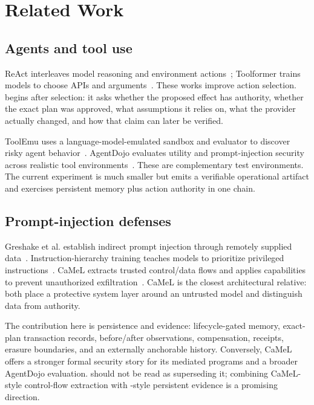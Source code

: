 \section{Related Work}

\subsection{Agents and tool use}

ReAct interleaves model reasoning and environment actions~\cite{yao2023react}; Toolformer trains models to choose APIs and arguments~\cite{schick2023toolformer}. These works improve action selection. \system{} begins after selection: it asks whether the proposed effect has authority, whether the exact plan was approved, what assumptions it relies on, what the provider actually changed, and how that claim can later be verified.

ToolEmu uses a language-model-emulated sandbox and evaluator to discover risky agent behavior~\cite{ruan2023toolemu}. AgentDojo evaluates utility and prompt-injection security across realistic tool environments~\cite{debenedetti2024agentdojo}. These are complementary test environments. The current \system{} experiment is much smaller but emits a verifiable operational artifact and exercises persistent memory plus action authority in one chain.

\subsection{Prompt-injection defenses}

Greshake et al. establish indirect prompt injection through remotely supplied data~\cite{greshake2023indirect}. Instruction-hierarchy training teaches models to prioritize privileged instructions~\cite{wallace2024hierarchy}. CaMeL extracts trusted control/data flows and applies capabilities to prevent unauthorized exfiltration~\cite{debenedetti2025camel}. CaMeL is the closest architectural relative: both place a protective system layer around an untrusted model and distinguish data from authority.

The contribution here is persistence and evidence: lifecycle-gated memory, exact-plan transaction records, before/after observations, compensation, receipts, erasure boundaries, and an externally anchorable history. Conversely, CaMeL offers a stronger formal security story for its mediated programs and a broader AgentDojo evaluation. \system{} should not be read as superseding it; combining CaMeL-style control-flow extraction with \system-style persistent evidence is a promising direction.

